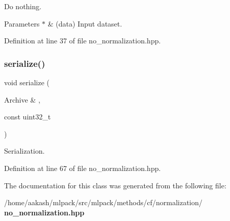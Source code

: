 Do nothing. 


\begin{DoxyParams}{Parameters}
{\em $\ast$} & (data) Input dataset. \\
\hline
\end{DoxyParams}


Definition at line 37 of file no\+\_\+normalization.\+hpp.

\mbox{\label{classmlpack_1_1cf_1_1NoNormalization_aa2ccb5a0533a6ba0abe6dfc1f98fbafb}} 
\subsubsection{serialize()}
{\footnotesize\ttfamily void serialize (\begin{DoxyParamCaption}\item[{Archive \&}]{,  }\item[{const uint32\+\_\+t}]{ }\end{DoxyParamCaption})\hspace{0.3cm}{\ttfamily [inline]}}



Serialization. 



Definition at line 67 of file no\+\_\+normalization.\+hpp.



The documentation for this class was generated from the following file\+:\begin{DoxyCompactItemize}
\item 
/home/aakash/mlpack/src/mlpack/methods/cf/normalization/\textbf{ no\+\_\+normalization.\+hpp}\end{DoxyCompactItemize}
